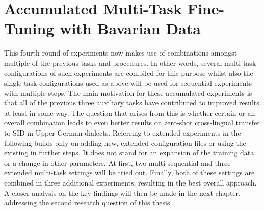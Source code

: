 \documentclass[11pt,a4paper,twoside,openright]{scrbook}
\begin{document}
\begin{table}[!ht]
\caption{Results for the basic continuous pre-training MLMxNLU experiment with mDeBERTa according to Upper German dialects over three random seeds, Avg. = average on languages without English, German and Swiss German, Diff. = average performance difference to mDeBERTa baseline, sd = standard deviation}
\label{tab:mDeBERTa_exp3_mlmnlu_dialects}
\end{table}







\section{Accumulated Multi-Task Fine-Tuning with Bavarian Data}

This fourth round of experiments now makes use of combinations amongst multiple of the previous tasks and procedures. In other words, several multi-task configurations of such experiments are compiled for this purpose whilst also the single-task configurations used as above will be used for sequential experiments with multiple steps. The main motivation for these accumulated experiments is that all of the previous three auxiliary tasks have contributed to improved results at least in some way. The question that arises from this is whether certain or an overall combination leads to even better results on zero-shot cross-lingual transfer to SID in Upper German dialects. Referring to extended experiments in the following builds only on adding new, extended configuration files or using the existing in further steps. It does not stand for an expansion of the training data or a change in other parameters. At first, two multi sequential and three extended multi-task settings will be tried out. Finally, both of these settings are combined in three additional experiments, resulting in the best overall approach. A closer analysis on the key findings will then be made in the next chapter, addressing the second research question of this thesis.
\end{document}
